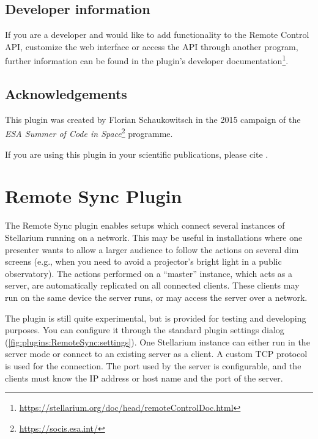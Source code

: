   
\subsection{Developer information}
\label{sec:plugins:RemoteControl:developer}

If you are a developer and would like to add functionality to the Remote 
Control API, customize the web interface or access the API through another 
program, further information can be found in the plugin's 
developer documentation\footnote{\url{https://stellarium.org/doc/head/remoteControlDoc.html}}.

\subsection{Acknowledgements}

This plugin was created by Florian Schaukowitsch in the 2015 campaign of the 
\emph{ESA Summer of Code in Space}\footnote{\url{https://socis.esa.int/}} programme. 

If you are using this plugin in your scientific publications, please cite \citet{Zotti-etal:SEAC2016}.

\newpage
\section{Remote Sync Plugin}
\label{sec:plugin:RemoteSync}

The Remote Sync plugin enables setups which connect several instances of
Stellarium running on a network. This may be useful in installations where one
presenter wants to allow a larger audience to follow the actions on several
dim screens (e.g., when you need to avoid a projector's bright light in a 
public observatory). The actions 
performed on a ``master'' instance, which acts as a server, are automatically 
replicated on all connected clients. These clients may run on the same device 
the server runs, or may access the server over a network.

The plugin is still quite experimental, but is provided for testing and developing purposes.
You can configure it through the standard plugin settings dialog 
(\autoref{fig:plugins:RemoteSync:settings}). One Stellarium instance
can either run in the server mode or connect to an existing server as a client.
A custom TCP protocol is used for the connection. The port used by the server is
configurable, and the clients must know the IP address or host name and the port
of the server.

